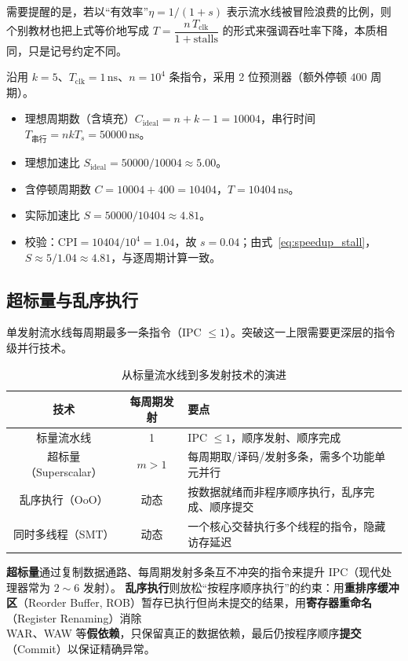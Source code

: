 需要提醒的是，若以“有效率”$\eta = 1/(1+s)$ 表示流水线被冒险浪费的比例，则个别教材也把上式等价地写成 $T = \dfrac{n\,T_{\text{clk}}}{1+\text{stalls}}$ 的形式来强调吞吐率下降，本质相同，只是记号约定不同。

\begin{example}[含停顿的加速比]
沿用 $k = 5$、$T_{\text{clk}} = 1\,\text{ns}$、$n = 10^4$ 条指令，采用 2 位预测器（额外停顿 $400$ 周期）。
\begin{itemize}
    \item 理想周期数（含填充）$C_{\text{ideal}} = n + k - 1 = 10004$，串行时间 $T_{\text{串行}} = n k T_s = 50000\,\text{ns}$。
    \item 理想加速比 $S_{\text{ideal}} = 50000 / 10004 \approx 5.00$。
    \item 含停顿周期数 $C = 10004 + 400 = 10404$，$T = 10404\,\text{ns}$。
    \item 实际加速比 $S = 50000 / 10404 \approx 4.81$。
    \item 校验：$\text{CPI} = 10404 / 10^4 = 1.04$，故 $s = 0.04$；由式~\eqref{eq:speedup_stall}，$S \approx 5 / 1.04 \approx 4.81$，与逐周期计算一致。
\end{itemize}
\end{example}

\subsection{超标量与乱序执行}

单发射流水线每周期最多一条指令（IPC $\le 1$）。突破这一上限需要更深层的指令级并行技术。

\begin{table}[H]
\centering
\caption{从标量流水线到多发射技术的演进}
\label{tab:superscalar}
\begin{tabulary}{\textwidth}{CCL}
\toprule
\textbf{技术} & \textbf{每周期发射} & \textbf{要点} \\
\midrule
标量流水线 & 1 & IPC $\le 1$，顺序发射、顺序完成 \\
超标量（Superscalar） & $m > 1$ & 每周期取/译码/发射多条，需多个功能单元并行 \\
乱序执行（OoO） & 动态 & 按数据就绪而非程序顺序执行，乱序完成、顺序提交 \\
同时多线程（SMT） & 动态 & 一个核心交替执行多个线程的指令，隐藏访存延迟 \\
\bottomrule
\end{tabulary}
\end{table}

\textbf{超标量}通过复制数据通路、每周期发射多条互不冲突的指令来提升 IPC（现代处理器常为 $2 \sim 6$ 发射）。
\textbf{乱序执行}则放松“按程序顺序执行”的约束：用\textbf{重排序缓冲区}（Reorder Buffer, ROB）暂存已执行但尚未提交的结果，用\textbf{寄存器重命名}（Register Renaming）消除 \\
\textsf{WAR}、\textsf{WAW} 等\textbf{假依赖}，只保留真正的数据依赖，最后仍按程序顺序\textbf{提交}（Commit）以保证精确异常。

